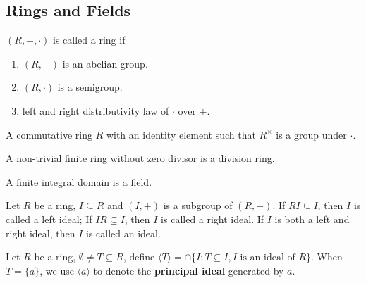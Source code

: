 \documentclass[11pt,fleqn]{book} %
\begin{document}
\begin{CJK}{UTF8}{gkai}
\chapter{Rings and Fields}
\begin{definition}
	[ring] $(R,+,\cdot)$ is called a ring if 
	\begin{enumerate}
		\item $(R, +)$ is an abelian group.
		\item $(R, \cdot)$ is a semigroup.
		\item left and right distributivity law of $\cdot$ over $+$.
	\end{enumerate}
\end{definition}

\begin{definition}
\end{definition}

\begin{definition}
	[field] A commutative ring $R$ with an identity element such that $R^{\times}$ is a group under $\cdot$.
\end{definition}

\begin{theorem}
	A non-trivial finite ring without zero divisor is a division ring.
\end{theorem}

\begin{corollary}
	A finite integral domain is a field.	
\end{corollary}

\begin{definition}
\end{definition}

\begin{definition}
	 Let $R$ be a ring, $I \subseteq R$ and $(I, +)$ is a subgroup of $(R, +)$. 
	If $RI \subseteq I$, then $I$ is called a left ideal; If $IR \subseteq I$, then $I$ is called a right ideal.
	If $I$ is both a left and right ideal, then $I$ is called an ideal.
\end{definition}

\begin{definition}
	 Let $R$ be a ring, $\emptyset \neq T \subseteq R$, define $\langle T\rangle = \cap \{I : T \subseteq I, I \text{ is an ideal of } R\} $.
	When $T = \{a\}$, we use $\langle a \rangle$ to denote the {\bf principal ideal} generated by $a$.
\end{definition}


\end{CJK}
\end{document}
